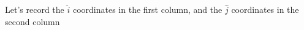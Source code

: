 \documentclass[preview]{standalone}
\begin{document}
\begin{minipage}
{8cm}Let's record the $\hat{i}$ coordinates in the first column, and the $\hat{j}$ coordinates in the second column
\end{minipage}
\end{document}
